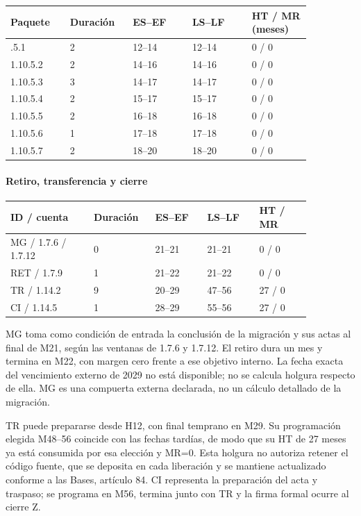 \begin{longtable}{@{}p{0.171\linewidth}p{0.171\linewidth}p{0.171\linewidth}p{0.171\linewidth}p{0.171\linewidth}@{}}
\toprule
\textbf{Paquete} & \textbf{Duración} & \textbf{ES–EF} & \textbf{LS–LF} & \textbf{HT / MR (meses)} \\
\midrule
\endhead
\bottomrule
\endlastfoot
1.10.5.1 & 2 & 12–14 & 12–14 & 0 / 0 \\
1.10.5.2 & 2 & 14–16 & 14–16 & 0 / 0 \\
1.10.5.3 & 3 & 14–17 & 14–17 & 0 / 0 \\
1.10.5.4 & 2 & 15–17 & 15–17 & 0 / 0 \\
1.10.5.5 & 2 & 16–18 & 16–18 & 0 / 0 \\
1.10.5.6 & 1 & 17–18 & 17–18 & 0 / 0 \\
1.10.5.7 & 2 & 18–20 & 18–20 & 0 / 0 \\
\end{longtable}

\paragraph{Retiro, transferencia y cierre}

\begin{longtable}{@{}p{0.247\linewidth}p{0.152\linewidth}p{0.152\linewidth}p{0.152\linewidth}p{0.152\linewidth}@{}}
\toprule
\textbf{ID / cuenta} & \textbf{Duración} & \textbf{ES–EF} & \textbf{LS–LF} & \textbf{HT / MR} \\
\midrule
\endhead
\bottomrule
\endlastfoot
MG / 1.7.6 / 1.7.12 & 0 & 21–21 & 21–21 & 0 / 0 \\
RET / 1.7.9 & 1 & 21–22 & 21–22 & 0 / 0 \\
TR / 1.14.2 & 9 & 20–29 & 47–56 & 27 / 0 \\
CI / 1.14.5 & 1 & 28–29 & 55–56 & 27 / 0 \\
\end{longtable}

MG toma como condición de entrada la conclusión de la migración y sus actas al final de M21, según las ventanas de 1.7.6 y 1.7.12. El retiro dura un mes y termina en M22, con margen cero frente a ese objetivo interno. La fecha exacta del vencimiento externo de 2029 no está disponible; no se calcula holgura respecto de ella. MG es una compuerta externa declarada, no un cálculo detallado de la migración.

TR puede prepararse desde H12, con final temprano en M29. Su programación elegida M48–56 coincide con las fechas tardías, de modo que su HT de 27 meses ya está consumida por esa elección y MR=0. Esta holgura no autoriza retener el código fuente, que se deposita en cada liberación y se mantiene actualizado conforme a las Bases, artículo 84. CI representa la preparación del acta y traspaso; se programa en M56, termina junto con TR y la firma formal ocurre al cierre Z.

